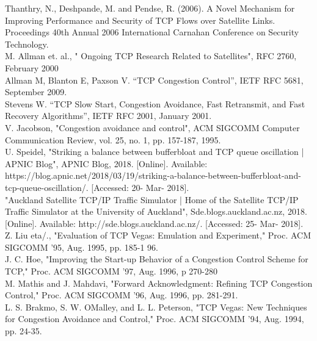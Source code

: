 \documentclass{uathesis}
\begin{document}
\noindent[15 Ref2]  Thanthry, N., Deshpande, M. and Pendse, R. (2006). A Novel Mechanism for Improving Performance and Security of TCP Flows over Satellite Links. Proceedings 40th Annual 2006 International Carnahan Conference on Security Technology.\\

\noindent[16] M. Allman et. al., " Ongoing TCP Research Related to Satellites", RFC 2760, February 2000 \\

\noindent [17] Allman M, Blanton E, Paxson V. “TCP Congestion Control”, IETF RFC 5681, September 2009. \\

\noindent [18] Stevens W. “TCP Slow Start, Congestion Avoidance, Fast Retransmit, and Fast Recovery Algorithms”, IETF RFC 2001, January 2001. \\

\noindent[19] V. Jacobson, "Congestion avoidance and control", ACM SIGCOMM Computer Communication Review, vol. 25, no. 1, pp. 157-187, 1995. \\

\noindent [20] U. Speidel, "Striking a balance between bufferbloat and TCP queue oscillation | APNIC Blog", APNIC Blog, 2018. [Online]. Available: https://blog.apnic.net/2018/03/19/striking-a-balance-between-bufferbloat-and-tcp-queue-oscillation/. [Accessed: 20- Mar- 2018].\\

\noindent [21] "Auckland Satellite TCP/IP Traffic Simulator | Home of the Satellite TCP/IP Traffic Simulator at the University of Auckland", Sde.blogs.auckland.ac.nz, 2018. [Online]. Available: http://sde.blogs.auckland.ac.nz/. [Accessed: 25- Mar- 2018].\\

\noindent [22] Z. Liu eta/., "Evaluation of TCP Vegas: Emulation and Experiment," Proc. ACM SIGCOMM '95, Aug. 1995, pp. 185-1 96.\\

\noindent [23] J. C. Hoe, "Improving the Start-up Behavior of a Congestion Control Scheme for TCP," Proc. ACM SIGCOMM '97, Aug. 1996, p 270-280 \\

\noindent [24] M. Mathis and J. Mahdavi, "Forward Acknowledgment: Refining TCP Congestion Control," Proc. ACM SIGCOMM '96, Aug. 1996, pp. 281-291.\\

\noindent [25] L. S. Brakmo, S. W. OMalley, and L. L. Peterson, "TCP Vegas: New Techniques for Congestion Avoidance and Control," Proc. ACM SIGCOMM '94,
Aug. 1994, pp. 24-35.\\
\end{document}
